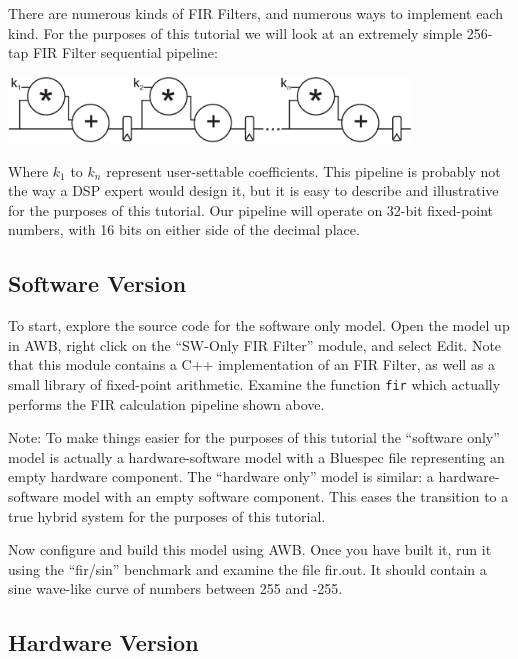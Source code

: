 \documentclass{article}
\begin{document}
There are numerous kinds of FIR Filters, and numerous ways to implement each kind. For the purposes of this tutorial we will look at
an extremely simple 256-tap FIR Filter sequential pipeline:

\vspace{10pt}
\begin{centering}

    \includegraphics[width=0.80\textwidth]{FIRFilter.pdf}

\end{centering}

Where $k_1$ to $k_n$ represent user-settable coefficients. This pipeline is probably not the way a DSP expert would design it, but it is easy to describe and
illustrative for the purposes of this tutorial. Our pipeline will operate on 32-bit fixed-point numbers, with 16 bits on either side of the decimal place.

\subsection{Software Version}

To start, explore the source code for the software only model. Open the model up in AWB, right click on the ``SW-Only FIR Filter''
module, and select Edit. Note that this module contains a C++ implementation of an FIR Filter, as well as a small library of
fixed-point arithmetic. Examine the function \texttt{fir} which actually performs the FIR calculation pipeline shown above.

Note: To make things easier for the purposes of this tutorial the ``software only'' model is actually a hardware-software model with a Bluespec file representing
an empty hardware component. The ``hardware only'' model is similar: a hardware-software model with an empty software component. This eases the transition to a
true hybrid system for the purposes of this tutorial.

Now configure and build this model using AWB. Once you have built it, run it using the ``fir/sin'' benchmark and examine the file fir.out. It should contain a
sine wave-like curve of numbers between 255 and -255.

\subsection{Hardware Version}
\end{document}
